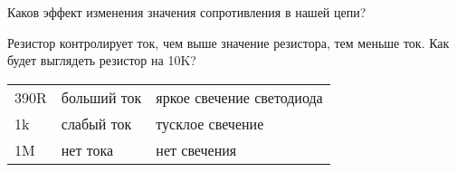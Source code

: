 
Каков эффект изменения значения сопротивления в нашей цепи?

Резистор контролирует ток, чем выше значение резистора, тем меньше ток.
Как будет выглядеть резистор на 10K?

\bigskip\begin{tabular}{l l l}
390R & больший ток & яркое свечение светодиода \\
1k & слабый ток & тусклое свечение \\
1M & нет тока & нет свечения \\
\end{tabular}
